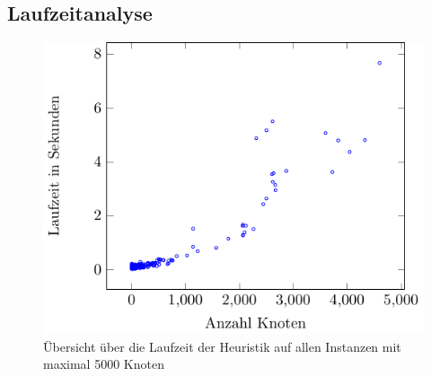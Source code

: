\documentclass[11pt, a4paper, german]{article}
\begin{document}
 \newpage
 \subsection{Laufzeitanalyse}
 \label{subsec:laufzeitanalyse} 
   \begin{figure}
		\includegraphics[width=1\linewidth]{pictures/tex_files/analysis/local_time_test}
		\caption{\"Ubersicht \"uber die Laufzeit der Heuristik auf allen Instanzen mit maximal 5000 Knoten}
		\label{bild:local_time_test}
	\end{figure}
\end{document}
